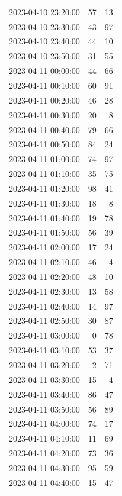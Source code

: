 \documentclass[
  letterpaper,
  DIV=11,
  numbers=noendperiod]{scrartcl}
\begin{document}
\begin{tabular}{lrr}
2023-04-10 23:20:00 &    57 &    13 \\
2023-04-10 23:30:00 &    43 &    97 \\
2023-04-10 23:40:00 &    44 &    10 \\
2023-04-10 23:50:00 &    31 &    55 \\
2023-04-11 00:00:00 &    44 &    66 \\
2023-04-11 00:10:00 &    60 &    91 \\
2023-04-11 00:20:00 &    46 &    28 \\
2023-04-11 00:30:00 &    20 &     8 \\
2023-04-11 00:40:00 &    79 &    66 \\
2023-04-11 00:50:00 &    84 &    24 \\
2023-04-11 01:00:00 &    74 &    97 \\
2023-04-11 01:10:00 &    35 &    75 \\
2023-04-11 01:20:00 &    98 &    41 \\
2023-04-11 01:30:00 &    18 &     8 \\
2023-04-11 01:40:00 &    19 &    78 \\
2023-04-11 01:50:00 &    56 &    39 \\
2023-04-11 02:00:00 &    17 &    24 \\
2023-04-11 02:10:00 &    46 &     4 \\
2023-04-11 02:20:00 &    48 &    10 \\
2023-04-11 02:30:00 &    13 &    58 \\
2023-04-11 02:40:00 &    14 &    97 \\
2023-04-11 02:50:00 &    30 &    87 \\
2023-04-11 03:00:00 &     0 &    78 \\
2023-04-11 03:10:00 &    53 &    37 \\
2023-04-11 03:20:00 &     2 &    71 \\
2023-04-11 03:30:00 &    15 &     4 \\
2023-04-11 03:40:00 &    86 &    47 \\
2023-04-11 03:50:00 &    56 &    89 \\
2023-04-11 04:00:00 &    74 &    17 \\
2023-04-11 04:10:00 &    11 &    69 \\
2023-04-11 04:20:00 &    73 &    36 \\
2023-04-11 04:30:00 &    95 &    59 \\
2023-04-11 04:40:00 &    15 &    47 \\

\end{tabular}
\end{document}
